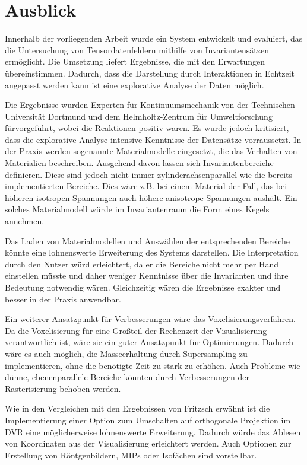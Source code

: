 \documentclass[a4paper,fontsize=12pt,toc=bib,halfparskip]{scrartcl}
\begin{document}
\section{Ausblick}
\label{sec:Ausblick}
Innerhalb der vorliegenden Arbeit wurde ein System entwickelt und evaluiert, das die Untersuchung von Tensordatenfeldern mithilfe von Invariantens\"atzen erm\"oglicht. Die Umsetzung liefert Ergebnisse, die mit den Erwartungen \"ubereinstimmen. Dadurch, dass die Darstellung durch Interaktionen in Echtzeit angepasst werden kann ist eine explorative Analyse der Daten m\"oglich. 

Die Ergebnisse wurden Experten f\"ur Kontinuumsmechanik von der Technischen Universit\"at Dortmund und dem Helmholtz-Zentrum f\"ur Umweltforschung f\"urvorgef\"uhrt, wobei die Reaktionen positiv waren. Es wurde jedoch kritisiert, dass die explorative Analyse intensive Kenntnisse der Datens\"atze vorraussetzt. In der Praxis werden sogenannte Materialmodelle eingesetzt, die das Verhalten von Materialien beschreiben. Ausgehend davon lassen sich Invariantenbereiche definieren. Diese sind jedoch nicht immer zylinderachsenparallel wie die bereits implementierten Bereiche. Dies w\"are z.B. bei einem Material der Fall, das bei h\"oheren isotropen Spannungen auch h\"ohere anisotrope Spannungen aush\"alt. Ein solches Materialmodell w\"urde im Invariantenraum die Form eines Kegels annehmen. 

Das Laden von Materialmodellen und Ausw\"ahlen der entsprechenden Bereiche k\"onnte eine lohnenswerte Erweiterung des Systems darstellen. Die Interpretation durch den Nutzer w\"urd erleichtert, da er die Bereiche nicht mehr per Hand einstellen m\"usste und daher weniger Kenntnisse \"uber die Invarianten und ihre Bedeutung notwendig w\"aren. Gleichzeitig w\"aren die Ergebnisse exakter und besser in der Praxis anwendbar. 

Ein weiterer Ansatzpunkt f\"ur Verbesserungen w\"are das Voxelisierungsverfahren. Da die Voxelisierung f\"ur eine Gro{\ss}teil der Rechenzeit der Visualisierung verantwortlich ist, w\"are sie ein guter Ansatzpunkt f\"ur Optimierungen. Dadurch w\"are es auch m\"oglich, die Masseerhaltung durch Supersampling zu implementieren, ohne die ben\"otigte Zeit zu stark zu erh\"ohen. Auch Probleme wie d\"unne, ebenenparallele Bereiche k\"onnten durch Verbesserungen der Rasterisierung behoben werden.

Wie in den Vergleichen mit den Ergebnissen von Fritzsch erw\"ahnt ist die Implementierung einer Option zum Umschalten auf orthogonale Projektion im DVR eine m\"oglicherweise lohnenswerte Erweiterung. Dadurch w\"urde das Ablesen von Koordinaten aus der Visualisierung erleichtert werden. Auch Optionen zur Erstellung von R\"ontgenbildern, MIPs oder Isof\"achen sind vorstellbar.
\end{document}
